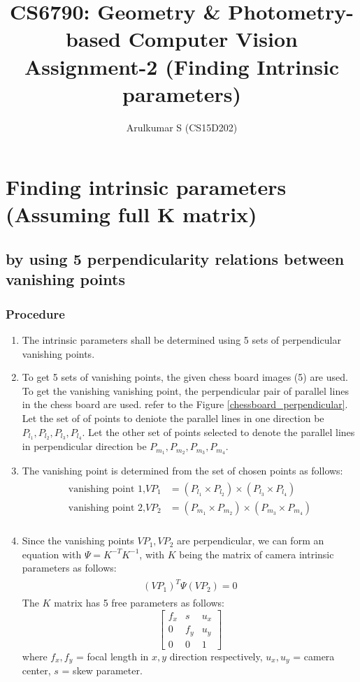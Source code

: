 \documentclass[fleqn]{article}
\title{CS6790: Geometry \& Photometry-based Computer Vision \\ Assignment-2 (Finding Intrinsic parameters)}
\author{Arulkumar S (CS15D202)}
\date{}
\begin{document}
 
\maketitle
\section{Finding intrinsic parameters (Assuming full K matrix)}
\subsection{by using 5 perpendicularity relations between vanishing points}
\subsubsection{Procedure}
 
\begin{enumerate} 
  \item The intrinsic parameters shall be determined using 5 sets of perpendicular vanishing points.
  \item To get 5 sets of vanishing points, the given chess board images (5) are used. To get the vanishing vanishing point, the perpendicular
  pair of parallel lines in the chess board are used. refer to the Figure \ref{chessboard_perpendicular}.  Let the set of of points to deniote
  the parallel lines in one direction be $P_{l_1}, P_{l_2}, P_{l_3}, P_{l_4}$. Let the other set of points selected to denote the parallel lines in
  perpendicular direction be $P_{m_1}, P_{m_2}, P_{m_3}, P_{m_4}$.
  \item The vanishing point is determined from the set of chosen points as follows:
  \begin{eqnarray*}
  \begin{aligned}
  \text{vanishing point 1,} VP_1 &= (P_{l_1} \times P_{l_2}) \times (P_{l_3} \times P_{l_4})\\
  \text{vanishing point 2,} VP_2 &= (P_{m_1} \times P_{m_2}) \times (P_{m_3} \times P_{m_4})\\
  \end{aligned}
  \end{eqnarray*} 
  
 \item Since the vanishing points $VP_1, VP_2$ are perpendicular, we can form an equation with $\Psi = K^{-T}K^{-1}$, with $K$ being the matrix of
 camera intrinsic parameters as follows:
  \begin{eqnarray*}
  \begin{aligned}
  (VP_1)^T \Psi (VP_2) = 0
  \end{aligned}
  \end{eqnarray*}
  The $K$ matrix has 5 free parameters as follows:
  \[
   \begin{bmatrix}
   		f_x & s & u_x \\
   		0 & f_y & u_y \\
   		0 & 0 & 1
   \end{bmatrix}
  \]
  where  $f_x, f_y $ = focal length in $x, y$ direction respectively, $u_x, u_y$ = camera center, $s$ = skew parameter.
  

\end{enumerate}
\end{document}
